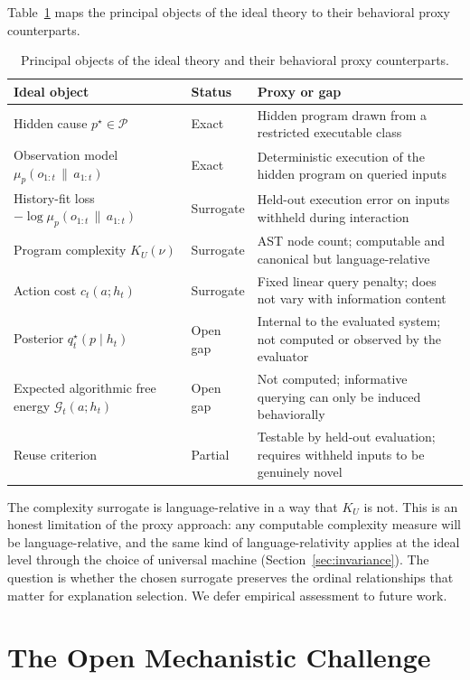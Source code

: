 \documentclass[11pt]{article}
\theoremstyle{remark}
\newcommand{\Pcal}{\mathcal{P}}
\newcommand{\Gcal}{\mathcal{G}}
\newcommand{\givena}{\,\|\,}
\begin{document}
Table~\ref{tab:proxy-map} maps the principal objects of the ideal theory to their behavioral proxy counterparts.

\begin{table}[t]
\centering
\caption{Principal objects of the ideal theory and their behavioral proxy counterparts.}
\begin{tabularx}{\textwidth}{@{}p{}p{}X@{}}
\toprule
\textbf{Ideal object} & \textbf{Status} & \textbf{Proxy or gap} \\
\midrule
Hidden cause \(p^\star \in \Pcal\) & Exact & Hidden program drawn from a restricted executable class \\
Observation model \(\mu_p(o_{1:t}\givena a_{1:t})\) & Exact & Deterministic execution of the hidden program on queried inputs \\
History-fit loss \(-\log \mu_p(o_{1:t}\givena a_{1:t})\) & Surrogate & Held-out execution error on inputs withheld during interaction \\
Program complexity \(K_U(\nu)\) & Surrogate & AST node count; computable and canonical but language-relative \\
Action cost \(c_t(a;h_t)\) & Surrogate & Fixed linear query penalty; does not vary with information content \\
Posterior \(q_t^\star(p \mid h_t)\) & Open gap & Internal to the evaluated system; not computed or observed by the evaluator \\
Expected algorithmic free energy \(\Gcal_t(a;h_t)\) & Open gap & Not computed; informative querying can only be induced behaviorally \\
Reuse criterion & Partial & Testable by held-out evaluation; requires withheld inputs to be genuinely novel \\
\bottomrule
\end{tabularx}
\label{tab:proxy-map}
\end{table}

The complexity surrogate is language-relative in a way that \(K_U\) is not. This is an honest limitation of the proxy approach: any computable complexity measure will be language-relative, and the same kind of language-relativity applies at the ideal level through the choice of universal machine (Section~\ref{sec:invariance}). The question is whether the chosen surrogate preserves the ordinal relationships that matter for explanation selection. We defer empirical assessment to future work.

\section{The Open Mechanistic Challenge}
\label{sec:mechanistic}
\end{document}
